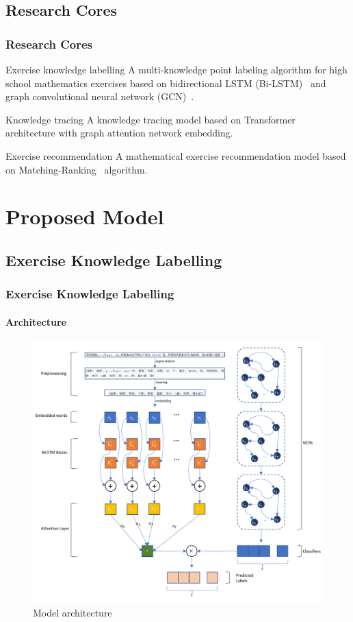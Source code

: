 \documentclass{beamer}
\begin{document}
\subsection{Research Cores}
\begin{frame}
  \frametitle{Research Cores}
  \begin{block}{Exercise knowledge labelling}
    A multi-knowledge point labeling algorithm for high school mathematics exercises based on bidirectional LSTM (Bi-LSTM)~\cite{chen2017improving} and graph convolutional neural network (GCN)~\cite{kipf2016semi}.
  \end{block}
  \begin{block}{Knowledge tracing}
    A knowledge tracing model based on Transformer~\cite{vaswani2017attention} architecture with graph attention network embedding.
  \end{block}
  \begin{block}{Exercise recommendation}
    A mathematical exercise recommendation model based on Matching-Ranking~\cite{segev2009context} algorithm.
  \end{block}
\end{frame}
\section{Proposed Model}
\subsection{Exercise Knowledge Labelling}
\begin{frame}
  \frametitle{Exercise Knowledge Labelling}
  \framesubtitle{Architecture}
  \begin{figure}
    \includegraphics[height=0.8\textheight]{figures/ch2-model-architecture.pdf}
    \caption{Model architecture}\label{fig:ch2-archi}
  \end{figure}
\end{frame}
\end{document}
